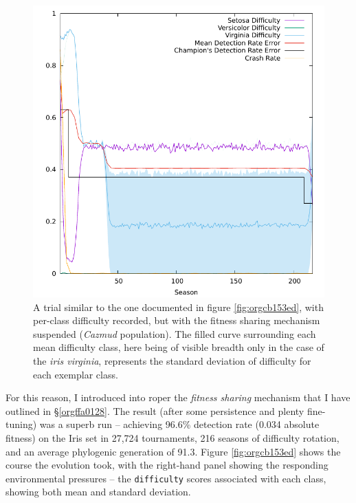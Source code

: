 \documentclass[12pt,glossary]{dalthesis}
\begin{document}
\begin{figure}[htbp]
\centering
\includegraphics[width=.9\linewidth]{../images/plots/nosharing.pdf}
\caption{\label{fig:org660faac}
A trial similar to the one documented in figure \ref{fig:orgcb153ed}, with per-class difficulty recorded, but with the fitness sharing mechanism suspended (\emph{Cazmud} population). The filled curve surrounding each mean difficulty class, here being of visible breadth only in the case of the \emph{iris virginia}, represents the standard deviation of difficulty for each exemplar class.}
\end{figure}

For this reason, I introduced into \gls{roper} the \emph{fitness sharing} mechanism 
that I have outlined in \S \ref{orgffa0128}. 
 The result (after some persistence and plenty fine-tuning) was a superb run --
achieving 96.6\% detection rate (0.034 absolute fitness) on the Iris set in
27,724 tournaments, 216 seasons of difficulty rotation, and an average
phylogenic generation of 91.3. Figure \ref{fig:orgcb153ed} shows the course the
evolution took, with the right-hand panel showing the responding environmental
pressures -- the \texttt{difficulty} scores associated with each class, showing both
mean and standard deviation.
\end{document}
